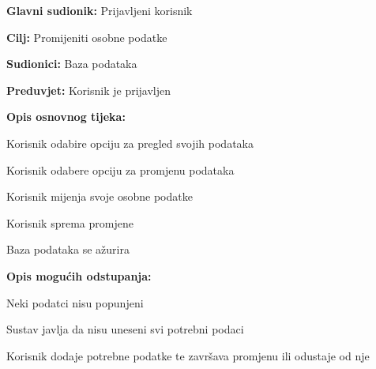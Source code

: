 						\noindent {}
					\begin{packed_item}
	
						\item \textbf{Glavni sudionik: }Prijavljeni korisnik
						\item  \textbf{Cilj: }Promijeniti osobne podatke
						\item  \textbf{Sudionici: }Baza podataka
						\item  \textbf{Preduvjet: }Korisnik je prijavljen
						\item  \textbf{Opis osnovnog tijeka:}
						
						\item[] \begin{packed_enum}
	
							\item Korisnik odabire opciju za pregled svojih podataka
							\item Korisnik odabere opciju za promjenu podataka
							\item Korisnik mijenja svoje osobne podatke
							\item Korisnik sprema promjene
							\item Baza podataka se ažurira


						\end{packed_enum}
						
						\item  \textbf{Opis mogućih odstupanja:}
						
						\item[] \begin{packed_item}
	
							\item[3.a] Neki podatci nisu popunjeni
							\item[] \begin{packed_enum}
								
								\item Sustav javlja da nisu uneseni svi potrebni podaci
								\item Korisnik dodaje potrebne podatke te završava promjenu ili odustaje od nje
								
							\end{packed_enum}
							
						\end{packed_item}						
					\end{packed_item}	



